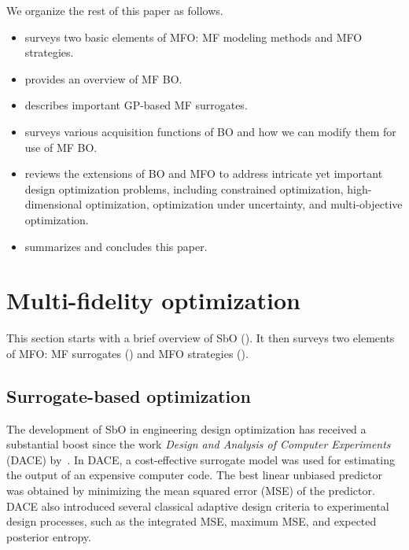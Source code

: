 \documentclass[journal ]{new-aiaa}
\begin{document}
	We organize the rest of this paper as follows.
	\begin{itemize}
		\item {} surveys two basic elements of MFO: MF modeling methods and MFO strategies.
		
		\item {} provides an overview of MF BO.
		
		\item {} describes important GP-based MF surrogates.
		
		\item {} surveys various acquisition functions of BO and how we can modify them for use of MF BO.
		
		\item {} reviews the extensions of BO and MFO to address intricate yet important design optimization problems, including constrained optimization, high-dimensional optimization, optimization under uncertainty, and multi-objective optimization.
		
		\item {} summarizes and concludes this paper.
	\end{itemize} 
	
	\section{Multi-fidelity optimization}\label{Sec2}
	
	This section starts with a brief overview of SbO ().
	It then surveys two elements of MFO: MF surrogates () and MFO strategies ().
	
	\subsection{Surrogate-based optimization}\label{Sec21}
	
	The development of SbO in engineering design optimization has received a substantial boost since the work \textit{Design and Analysis of Computer Experiments} (DACE) by~\citet{Sacks1989}.
	In DACE, a cost-effective surrogate model was used for estimating the output of an expensive computer code.
	The best linear unbiased predictor was obtained by minimizing the mean squared error (MSE) of the predictor.
	DACE also introduced several classical adaptive design criteria to experimental design processes, such as the integrated MSE, maximum MSE, and expected posterior entropy.
	
\end{document}
